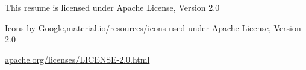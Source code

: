 \hspace{1pt}

\footnotesize{
\begin{center}
	
This resume is licensed under Apache License, Version 2.0

Icons by Google,{\secondaryColor\href{https://material.io/resources/icons}{material.io/resources/icons} }used under Apache License, Version 2.0

\secondaryColor\href{https://www.apache.org/licenses/LICENSE-2.0.html}{apache.org/licenses/LICENSE-2.0.html}
\end{center}

}
